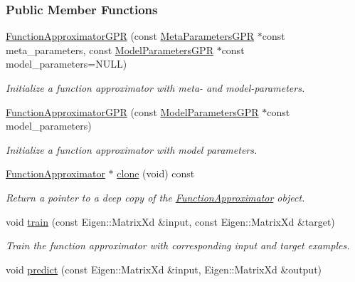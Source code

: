 \subsubsection*{Public Member Functions}
\begin{DoxyCompactItemize}
\item 
\hyperlink{classDmpBbo_1_1FunctionApproximatorGPR_afdf0d2f8b1ddfa701e58f7476da24f65}{Function\+Approximator\+G\+P\+R} (const \hyperlink{classDmpBbo_1_1MetaParametersGPR}{Meta\+Parameters\+G\+P\+R} $\ast$const meta\+\_\+parameters, const \hyperlink{classDmpBbo_1_1ModelParametersGPR}{Model\+Parameters\+G\+P\+R} $\ast$const model\+\_\+parameters=N\+U\+L\+L)
\begin{DoxyCompactList}\small\item\em Initialize a function approximator with meta-\/ and model-\/parameters. \end{DoxyCompactList}\item 
\hyperlink{classDmpBbo_1_1FunctionApproximatorGPR_a24f8841f307c66117f585f639b0a464e}{Function\+Approximator\+G\+P\+R} (const \hyperlink{classDmpBbo_1_1ModelParametersGPR}{Model\+Parameters\+G\+P\+R} $\ast$const model\+\_\+parameters)
\begin{DoxyCompactList}\small\item\em Initialize a function approximator with model parameters. \end{DoxyCompactList}\item 
\hyperlink{classDmpBbo_1_1FunctionApproximator}{Function\+Approximator} $\ast$ \hyperlink{classDmpBbo_1_1FunctionApproximatorGPR_ad792a46ac006916c5c1ffed2fa42dd24}{clone} (void) const 
\begin{DoxyCompactList}\small\item\em Return a pointer to a deep copy of the \hyperlink{classDmpBbo_1_1FunctionApproximator}{Function\+Approximator} object. \end{DoxyCompactList}\item 
void \hyperlink{classDmpBbo_1_1FunctionApproximatorGPR_ac453415cf4894aba45e8db6ebc4cd4dc}{train} (const Eigen\+::\+Matrix\+Xd \&input, const Eigen\+::\+Matrix\+Xd \&target)
\begin{DoxyCompactList}\small\item\em Train the function approximator with corresponding input and target examples. \end{DoxyCompactList}\item 
void \hyperlink{classDmpBbo_1_1FunctionApproximatorGPR_afe8dcfb9cd065dfde38dce1f6e6cd3e6}{predict} (const Eigen\+::\+Matrix\+Xd \&input, Eigen\+::\+Matrix\+Xd \&output)

\end{DoxyCompactItemize}
